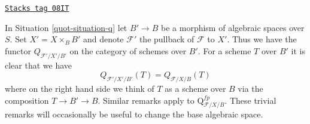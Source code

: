 \begin{remark}
\label{quot-remark-q-base-change}
\href{https://stacks.math.columbia.edu/tag/08IT}{\texttt{Stacks tag 08IT}}

In Situation \ref{quot-situation-q} let $B' \to B$ be a morphism of
algebraic spaces over $S$. Set $X' = X \times_B B'$ and denote
$\mathcal{F}'$ the pullback of $\mathcal{F}$ to $X'$.
Thus we have the functor $Q_{\mathcal{F}'/X'/B'}$ on
the category of schemes over $B'$. For a scheme $T$ over $B'$
it is clear that we have
$$
Q_{\mathcal{F}'/X'/B'}(T) = Q_{\mathcal{F}/X/B}(T)
$$
where on the right hand side we think of $T$ as a scheme over $B$
via the composition $T \to B' \to B$.
Similar remarks apply to $\text{Q}^{fp}_{\mathcal{F}/X/B}$.
These trivial remarks
will occasionally be useful to change the base algebraic space.
\end{remark}

